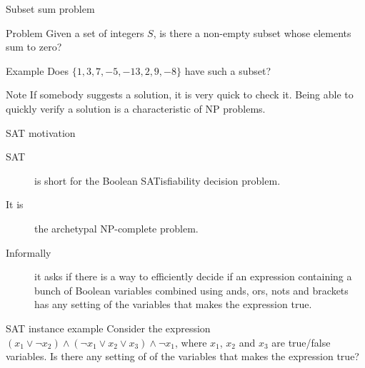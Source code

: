 \begin{frame}{Subset sum problem}
  
  \begin{alertblock}{Problem}
    Given a set of integers $S$, is there a non-empty subset whose elements sum to zero?
  \end{alertblock}

  \vspace{4mm}
  
  \begin{exampleblock}{Example}
    Does $\{ 1, 3, 7, -5, -13, 2, 9, -8 \}$ have such a subset?
  \end{exampleblock}
  
  \vspace{4mm}

  \begin{alertblock}{Note}
     If somebody suggests a solution, it is very quick to check it.
    Being able to quickly verify a solution is a characteristic of NP problems.
  \end{alertblock}
\end{frame}


\begin{frame}{SAT motivation}
  \begin{description}
    \item[SAT] is short for the Boolean SATisfiability decision problem.
    \item[It is] the archetypal NP-complete problem.
    \item[Informally] it asks if there is a way to efficiently decide if an expression containing a bunch of Boolean variables combined using ands, ors, nots and brackets has any setting of the variables that makes the expression true.
  \end{description}

  \begin{exampleblock}{SAT instance example}
    Consider the expression $(x_1 \lor \neg{x_2}) \land (\neg{x_1} \lor x_2 \lor x_3) \land \neg{x_1}$, where $x_1$, $x_2$ and $x_3$ are true/false variables.
    Is there any setting of of the variables that makes the expression true?
  \end{exampleblock}
\end{frame}


